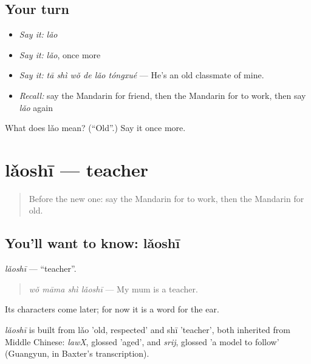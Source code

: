 \subsection*{Your turn}
\begin{itemize}
\raggedright
  \item \emph{Say it:} \emph{lǎo}
  \item \emph{Say it:} \emph{lǎo}, once more
  \item \emph{Say it:} \emph{tā shì wǒ de lǎo tóngxué} — He's an old classmate of mine.
  \item \emph{Recall:} say the Mandarin for friend, then the Mandarin for to work, then say \emph{lǎo} again
\end{itemize}

\begin{tcolorbox}[breakable,colback=teal!4,colframe=teal!35!black,title={Before you move on}]
What does lǎo mean? (\textquotedblleft{}Old\textquotedblright{}.) Say it once more.
\end{tcolorbox}
\section[lǎoshī]{lǎoshī — teacher}

\label{lesson:ZH-C35-laoshi}



\begin{quote}
Before the new one: say the Mandarin for to work, then the Mandarin for old.
\end{quote}

\subsection*{You'll want to know: lǎoshī}
\emph{lǎoshī} — \textquotedblleft{}teacher\textquotedblright{}.

\begin{quote}
\emph{wǒ māma shì lǎoshī} — My mum is a teacher.
\end{quote}

Its characters come later; for now it is a word for the ear.

\begin{cousinweb}
\emph{lǎoshī} is built from lǎo 'old, respected' and shī 'teacher', both inherited from Middle Chinese: \emph{lawX}, glossed 'aged', and \emph{srij}, glossed 'a model to follow' (Guangyun, in Baxter's transcription).
\end{cousinweb}

